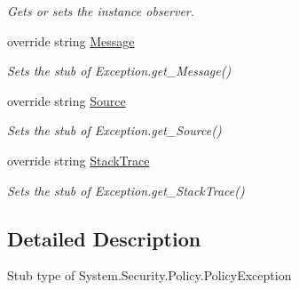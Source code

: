 \begin{DoxyCompactItemize}
\begin{DoxyCompactList}\small\item\em Gets or sets the instance observer.\end{DoxyCompactList}\item 
override string \hyperlink{class_system_1_1_security_1_1_policy_1_1_fakes_1_1_stub_policy_exception_a4d8c5959716dcf92e0d80b7b981f35ee}{Message}
\begin{DoxyCompactList}\small\item\em Sets the stub of Exception.\-get\-\_\-\-Message()\end{DoxyCompactList}\item 
override string \hyperlink{class_system_1_1_security_1_1_policy_1_1_fakes_1_1_stub_policy_exception_ac433cf6dc6851c5aff3918687f0853d8}{Source}
\begin{DoxyCompactList}\small\item\em Sets the stub of Exception.\-get\-\_\-\-Source()\end{DoxyCompactList}\item 
override string \hyperlink{class_system_1_1_security_1_1_policy_1_1_fakes_1_1_stub_policy_exception_abe3e728e16c05014d812617d3e90883e}{Stack\-Trace}
\begin{DoxyCompactList}\small\item\em Sets the stub of Exception.\-get\-\_\-\-Stack\-Trace()\end{DoxyCompactList}\end{DoxyCompactItemize}


\subsection{Detailed Description}
Stub type of System.\-Security.\-Policy.\-Policy\-Exception



